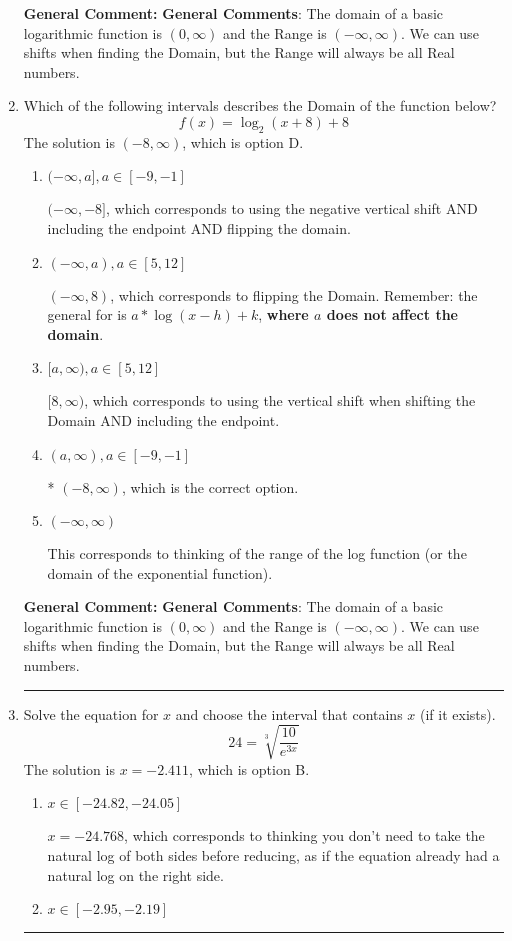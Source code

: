 \documentclass{extbook}[14pt]
\newcommand{\litem}[1]{\item #1

\rule{\textwidth}{0.4pt}}
\begin{document}
\begin{enumerate}
{\textbf{General Comment:} \textbf{General Comments}: The domain of a basic logarithmic function is $(0, \infty)$ and the Range is $(-\infty, \infty)$. We can use shifts when finding the Domain, but the Range will always be all Real numbers.
}
\litem{
Which of the following intervals describes the Domain of the function below?
\[ f(x) = \log_2{(x+8)}+8 \]The solution is \( (-8, \infty) \), which is option D.\begin{enumerate}[label=\Alph*.]
\item \( (-\infty, a], a \in [-9, -1] \)

$(-\infty, -8]$, which corresponds to using the negative vertical shift AND including the endpoint AND flipping the domain.
\item \( (-\infty, a), a \in [5, 12] \)

$(-\infty, 8)$, which corresponds to flipping the Domain. Remember: the general for is $a*\log(x-h)+k$, \textbf{where $a$ does not affect the domain}.
\item \( [a, \infty), a \in [5, 12] \)

$[8, \infty)$, which corresponds to using the vertical shift when shifting the Domain AND including the endpoint.
\item \( (a, \infty), a \in [-9, -1] \)

* $(-8, \infty)$, which is the correct option.
\item \( (-\infty, \infty) \)

This corresponds to thinking of the range of the log function (or the domain of the exponential function).
\end{enumerate}

\textbf{General Comment:} \textbf{General Comments}: The domain of a basic logarithmic function is $(0, \infty)$ and the Range is $(-\infty, \infty)$. We can use shifts when finding the Domain, but the Range will always be all Real numbers.
}
\litem{
 Solve the equation for $x$ and choose the interval that contains $x$ (if it exists).
\[  24 = \sqrt[3]{\frac{10}{e^{3x}}} \]The solution is \( x = -2.411 \), which is option B.\begin{enumerate}[label=\Alph*.]
\item \( x \in [-24.82, -24.05] \)

$x = -24.768$, which corresponds to thinking you don't need to take the natural log of both sides before reducing, as if the equation already had a natural log on the right side.
\item \( x \in [-2.95, -2.19] \)


\end{enumerate}}
\end{enumerate}
\end{document}
